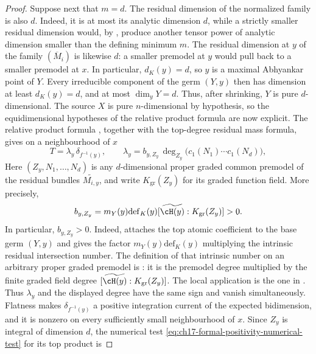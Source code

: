 \begin{proof}
Suppose next that $m=d$.  The residual dimension of the normalized family
is also $d$.  Indeed, it is at most its analytic dimension $d$, while a
strictly smaller residual dimension would, by
\cite[Proposition~17.6.4]{CLD25}, produce another tensor power of analytic
dimension smaller than the defining minimum $m$.  The residual dimension
at $y$ of the family $(\overline M_i)$ is likewise $d$: a smaller
premodel at $y$ would pull back to a smaller premodel at $x$.  In
particular, $d_K(y)=d$, so $y$ is a maximal Abhyankar point of $Y$.
Every irreducible component of the germ $(Y,y)$ then has dimension at
least $d_K(y)=d$, and at most $\dim_yY=d$.  Thus, after shrinking,
$Y$ is pure $d$-dimensional.  The source $X$ is pure
$n$-dimensional by hypothesis, so the equidimensional hypotheses of the
relative product formula are now explicit.
The relative product formula , together with the
top-degree residual mass formula, gives on a neighbourhood of $x$
\begin{equation}
 T=\lambda_y\,\delta_{f^{-1}(y)},
 \qquad
 \lambda_y=b_{y,Z_y}\,
   \deg_{Z_y}\bigl(c_1(N_1)\cdots c_1(N_d)\bigr),
 \label{eq:ch17-formal-positivity-relative-coefficient}
\end{equation}
Here $(Z_y,N_1,\ldots,N_d)$ is any $d$-dimensional proper graded
common premodel of the residual bundles $\widetilde{M_{i,y}}$, and
write $K_{\mathrm{gr}}(Z_y)$ for its graded function field.  More
precisely,
\begin{equation}
 b_{y,Z_y}
 =m_Y(y)\mathrm{def}_K(y)
   [\widetilde{\cH(y)}:K_{\mathrm{gr}}(Z_y)]>0.
 \label{eq:ch17-formal-positivity-normalization-factor}
\end{equation}
In particular, $b_{y,Z_y}>0$.
Indeed, \cite[Proposition~18.6.1]{CLD25} attaches the top atomic
coefficient to the base germ $(Y,y)$ and gives the factor
$m_Y(y)\mathrm{def}_K(y)$ multiplying the intrinsic residual
intersection number.  The definition of that intrinsic number on an
arbitrary proper graded premodel is
\cite[\S10.7.11]{CLD25}: it is the premodel degree multiplied by the finite
graded field degree
$[\widetilde{\cH(y)}:K_{\mathrm{gr}}(Z_y)]$.  The local application is
the one in \cite[\S18.8.3 and Theorem~18.8.4]{CLD25}.  Thus $\lambda_y$
and the displayed degree have the same sign and vanish simultaneously.
Flatness makes
$\delta_{f^{-1}(y)}$ a positive integration current of the expected
bidimension, and it is nonzero on every sufficiently small neighbourhood
of $x$.  Since $Z_y$ is integral of dimension $d$, the numerical
test \eqref{eq:ch17-formal-positivity-numerical-test} for its top product is

\end{proof}
